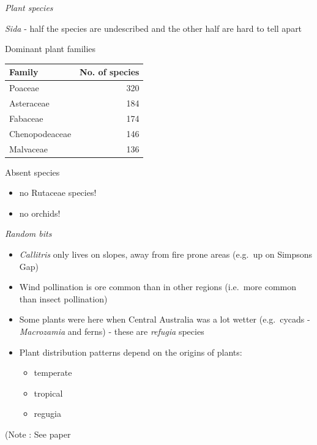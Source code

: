 \documentclass[
]{article}
\providecommand{\tightlist}{%
  \setlength{\itemsep}{0pt}\setlength{\parskip}{0pt}}
\begin{document}
\emph{Plant species}

\emph{Sida} - half the species are undescribed and the other half are
hard to tell apart

Dominant plant families

\begin{longtable}[t]{lr}
\toprule
Family & No. of species\\
\midrule
Poaceae & 320\\
Asteraceae & 184\\
Fabaceae & 174\\
Chenopodeaceae & 146\\
Malvaceae & 136\\
\bottomrule
\end{longtable}

Absent species

\begin{itemize}
\tightlist
\item
  no Rutaceae species!
\item
  no orchids!
\end{itemize}

\emph{Random bits}

\begin{itemize}
\tightlist
\item
  \emph{Callitris} only lives on slopes, away from fire prone areas
  (e.g.~up on Simpsons Gap)
\item
  Wind pollination is ore common than in other regions (i.e.~more common
  than insect pollination)
\item
  Some plants were here when Central Australia was a lot wetter
  (e.g.~cycads - \emph{Macrozamia} and ferns) - these are \emph{refugia}
  species
\item
  Plant distribution patterns depend on the origins of plants:

  \begin{itemize}
  \tightlist
  \item
    temperate
  \item
    tropical
  \item
    regugia
  \end{itemize}
\end{itemize}

(Note : See paper
\end{document}
